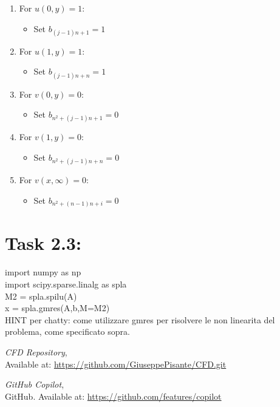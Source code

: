 \documentclass{article}
\begin{document}
\begin{enumerate}
  \item For \( u(0,y) = 1 \):
  \begin{itemize}
    \item Set \( b_{(j-1)n+1} = 1 \)
  \end{itemize}
  
  \item For \( u(1,y) = 1 \):
  \begin{itemize}
    \item Set \( b_{(j-1)n+n} = 1 \)
  \end{itemize}
  
  \item For \( v(0,y) = 0 \):
  \begin{itemize}
    \item Set \( b_{n^2+(j-1)n+1} = 0 \)
  \end{itemize}
  
  
   \item For \( v(1,y) = 0 \):
    \begin{itemize}
      \item Set \( b_{n^2+(j-1)n+n} = 0 \)
    \end{itemize}
  
  \item For \( v(x,\infty) = 0 \):
  \begin{itemize}
    \item Set \( b_{n^2+(n-1)n+i} = 0 \)
  \end{itemize}
\end{enumerate}

\section*{\Large Task 2.3:}
import numpy as np \\
import scipy.sparse.linalg as spla \\
M2 = spla.spilu(A)  \\
x = spla.gmres(A,b,M=M2)  \\

HINT per chatty: come utilizzare gmres per risolvere le non linearita del problema, come specificato sopra.

\begin{thebibliography}{9}
    \textit{CFD Repository},\\
    Available at: \url{https://github.com/GiuseppePisante/CFD.git}
    
    \textit{GitHub Copilot},\\
    GitHub. Available at: \url{https://github.com/features/copilot}
    \end{thebibliography}
\end{document}
